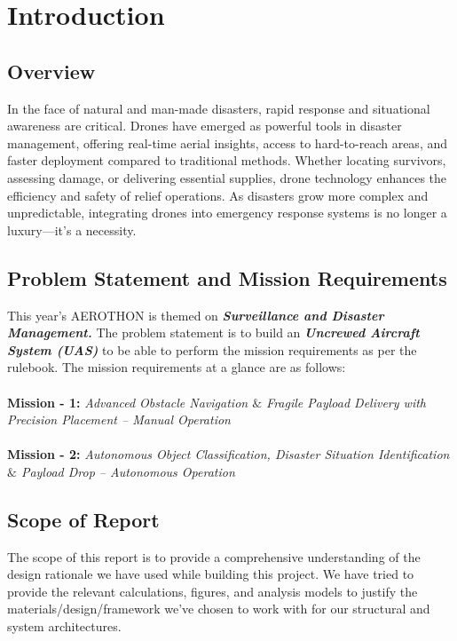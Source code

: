 \documentclass[12pt]{report}
\begin{document}
  \tableofcontents
  \newpage


  \chapter{Introduction}
  \section{Overview}

   In the face of natural and man-made disasters, rapid response and situational awareness are critical. Drones have emerged as powerful tools in disaster management, offering real-time aerial insights, access to hard-to-reach areas, and faster deployment compared to traditional methods. Whether locating survivors, assessing damage, or delivering essential supplies, drone technology enhances the efficiency and safety of relief operations. As disasters grow more complex and unpredictable, integrating drones into emergency response systems is no longer a luxury—it's a necessity.

    \section{Problem Statement and Mission Requirements}
    This year's AEROTHON is themed on \textbf{\textit{Surveillance and Disaster Management.}} The problem statement is to build an \textbf{\textit{Uncrewed Aircraft System (UAS)}} to be able to perform the mission requirements as per the rulebook. The mission requirements at a glance are as follows: \\ \\
    \textbf{Mission - 1:} \textit{Advanced Obstacle Navigation $\&$ Fragile Payload Delivery with Precision Placement – Manual Operation} \\ \\
    \textbf{Mission - 2:} \textit{Autonomous Object Classification, Disaster Situation Identification $\&$ Payload Drop – Autonomous Operation} 



    \section{Scope of Report}
    The scope of this report is to provide a comprehensive understanding of the design rationale we have used while building this project. We have tried to provide the relevant calculations, figures, and analysis models to justify the materials/design/framework we've chosen to work with for our structural and system architectures. \\ 
\end{document}
